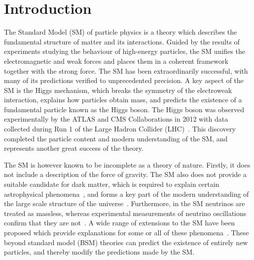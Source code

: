\chapter{Introduction}
\label{chap:intro}

The Standard Model (SM) of particle physics is a theory which describes
the fundamental structure of matter and its interactions.
Guided by the results of experiments studying the behaviour of high-energy particles, 
the SM unifies the electromagnetic and weak forces and places them in a coherent framework
together with the strong force.
The SM has been extraordinarily successful, 
with many of its predictions verified to unprecedented precision.
A key aspect of the SM is the Higgs mechanism, 
which breaks the symmetry of the electroweak interaction, explains how particles obtain mass, 
and predicts the existence of a fundamental particle known as the Higgs boson.
The Higgs boson was observed experimentally by the ATLAS and CMS Collaborations in 2012
with data collected during Run 1 of the Large Hadron Collider (LHC)~\cite{ATLASdiscovery,CMSdiscovery}.
This discovery completed the particle content and modern understanding of the SM, 
and represents another great success of the theory.

The SM is however known to be incomplete as a theory of nature.
Firstly, it does not include a description of the force of gravity.
The SM also does not provide a suitable candidate for dark matter, 
which is required to explain certain astrophysical phenomena~\cite{BulletCluster},
and forms a key part of the modern understanding 
of the large scale structure of the universe~\cite{Planck}.
Furthermore, in the SM neutrinos are treated as massless, 
whereas experimental measurements of neutrino oscillations confirm that they are not~\cite{NeutrinoOscillation}.
A wide range of extensions to the SM have been proposed 
which provide explanations for some or all of these phenomena~\cite{SUSY}.
These beyond standard model (BSM) theories can predict the existence of entirely new particles, 
and thereby modify the predictions made by the SM.

